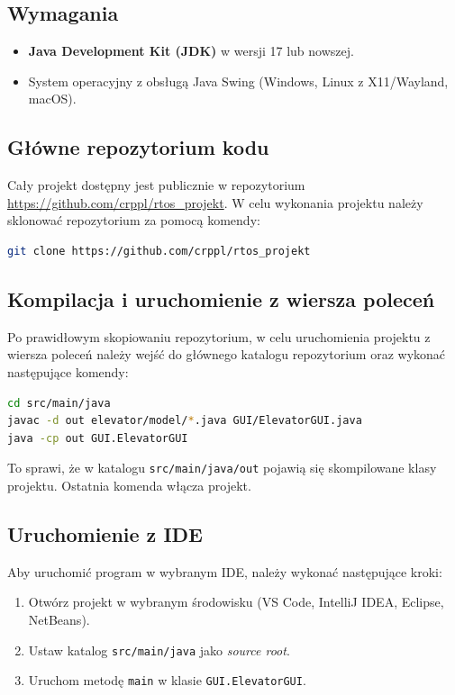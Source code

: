 \documentclass[12pt, a4paper]{article}
\begin{document}
\subsection{Wymagania}

\begin{itemize}
  \item \textbf{Java Development Kit (JDK)} w wersji 17 lub nowszej.
  \item System operacyjny z obsługą Java Swing (Windows, Linux z X11/Wayland, macOS).
\end{itemize}

\subsection{Główne repozytorium kodu}

Cały projekt dostępny jest publicznie w repozytorium \url{https://github.com/crppl/rtos_projekt}. 
W celu wykonania projektu należy sklonować repozytorium za pomocą komendy:
\begin{lstlisting}[language=bash, caption={Sklonowanie repozytorium}]
git clone https://github.com/crppl/rtos_projekt
\end{lstlisting}

\subsection{Kompilacja i uruchomienie z wiersza poleceń}

Po prawidłowym skopiowaniu repozytorium, w celu uruchomienia projektu z wiersza poleceń należy wejść do głównego katalogu repozytorium oraz wykonać następujące komendy:

\begin{lstlisting}[language=bash, caption={Kompilacja i uruchomienie projektu.}]
cd src/main/java
javac -d out elevator/model/*.java GUI/ElevatorGUI.java
java -cp out GUI.ElevatorGUI
\end{lstlisting}

To sprawi, że w katalogu \texttt{src/main/java/out} pojawią się skompilowane klasy projektu. Ostatnia komenda włącza projekt.

\subsection{Uruchomienie z IDE}

Aby uruchomić program w wybranym IDE, należy wykonać następujące kroki:

\begin{enumerate}
  \item Otwórz projekt w wybranym środowisku (VS Code, IntelliJ IDEA, Eclipse, NetBeans).
  \item Ustaw katalog \texttt{src/main/java} jako \emph{source root}.
  \item Uruchom metodę \texttt{main} w klasie \texttt{GUI.ElevatorGUI}.
\end{enumerate}
\end{document}
